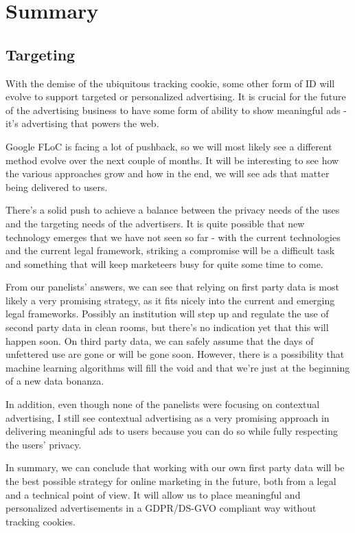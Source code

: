 %
%

\pagebreak
\section{Summary}

\onehalfspacing

\subsection{Targeting}

With the demise of the ubiquitous tracking cookie, some other form of ID will evolve to support targeted or personalized advertising. It is crucial for the future of the advertising business to have some form of ability to show meaningful ads - it's advertising that powers the web.

Google FLoC is facing a lot of pushback, so we will most likely see a different method evolve over the next couple of months. It will be interesting to see how the various approaches grow and how in the end, we will see ads that matter being delivered to users.

There's a solid push to achieve a balance between the privacy needs of the uses and the targeting needs of the advertisers. It is quite possible that new technology emerges that we have not seen so far - with the current technologies and the current legal framework, striking a compromise will be a difficult task and something that will keep marketeers busy for quite some time to come.

From our panelists' answers, we can see that relying on first party data is most likely a very promising strategy, as it fits nicely into the current and emerging legal frameworks. Possibly an institution will step up and regulate the use of second party data in clean rooms, but there's no indication yet that this will happen soon. On third party data, we can safely assume that the days of unfettered use are gone or will be gone soon. However, there is a possibility that machine learning algorithms will fill the void and that we're just at the beginning of a new data bonanza.

In addition, even though none of the panelists were focusing on contextual advertising, I still see contextual advertising as a very promising approach in delivering meaningful ads to users because you can do so while fully respecting the users' privacy.

In summary, we can conclude that working with our own first party data will be the best possible strategy for online marketing in the future, both from a legal and a technical point of view. It will allow us to place meaningful and personalized advertisements in a GDPR/DS-GVO compliant way without tracking cookies.

